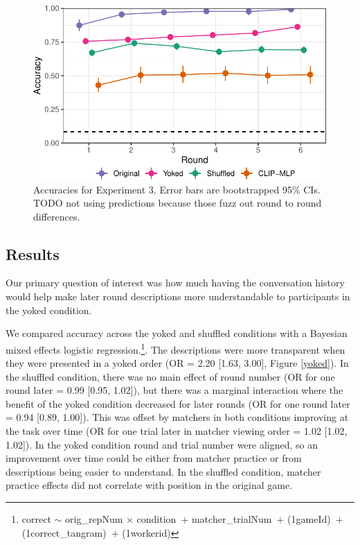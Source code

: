 \documentclass[10pt, letterpaper]{article}
\begin{document}
\begin{CodeChunk}
\begin{figure}[t]

{\centering \includegraphics[width=0.9\linewidth]{figs/fig-yoked-1} 

}

\caption[Accuracies for Experiment 3]{Accuracies for Experiment 3. Error bars are bootstrapped 95\% CIs. TODO not using predictions because those fuzz out round to round differences. \label{yoked}}\label{fig:fig-yoked}
\end{figure}
\end{CodeChunk}

\subsection{Results}\label{results-2}

Our primary question of interest was how much having the conversation
history would help make later round descriptions more understandable to
participants in the yoked condition.

We compared accuracy across the yoked and shuffled conditions with a
Bayesian mixed effects logistic regression.\footnote{correct \({\sim}\)
  orig\_repNum \({\times}\) condition~\({+}\) matcher\_trialNum~\({+}\)
  (1\textbar gameId)~\({+}\) (1\textbar correct\_tangram)~\({+}\)
  (1\textbar workerid)}. The descriptions were more transparent when
they were presented in a yoked order (OR = 2.20 {[}1.63, 3.00{]}, Figure
\ref{yoked}). In the shuffled condition, there was no main effect of
round number (OR for one round later = 0.99 {[}0.95, 1.02{]}), but there
was a marginal interaction where the benefit of the yoked condition
decreased for later rounds (OR for one round later = 0.94 {[}0.89,
1.00{]}). This was offset by matchers in both conditions improving at
the task over time (OR for one trial later in matcher viewing order =
1.02 {[}1.02, 1.02{]}). In the yoked condition round and trial number
were aligned, so an improvement over time could be either from matcher
practice or from descriptions being easier to understand. In the
shuffled condition, matcher practice effects did not correlate with
position in the original game.
\end{document}
